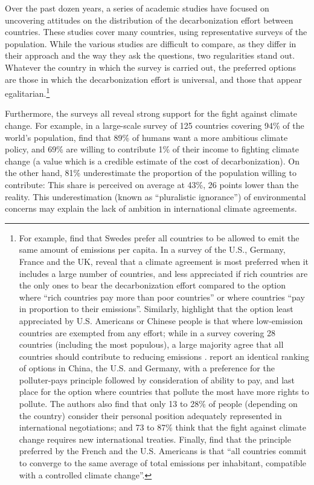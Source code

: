 \documentclass[a5paper,english,openany]{memoir}
\begin{document}
Over the past dozen years, a series of academic studies have focused on uncovering attitudes on the distribution of the decarbonization effort between countries. These studies cover many countries, using representative surveys of the population. While the various studies are difficult to compare, as they differ in their approach and the way they ask the questions, two regularities stand out. Whatever the country in which the survey is carried out, the preferred options are those in which the decarbonization effort is universal, and those that appear egalitarian.\footnote{For example, \citet{carlsson_is_2011} find that Swedes prefer all countries to be allowed to emit the same amount of emissions per capita. In a survey of the U.S., Germany, France and the UK, \citet{bechtel_mass_2013} reveal that a climate agreement is most preferred when it includes a large number of countries, %
and less appreciated if rich countries are the only ones to bear the decarbonization effort compared to the option where ``rich countries pay more than poor countries'' or where countries ``pay in proportion to their emissions''. Similarly, \citet{carlsson_fair_2013} highlight that the option least appreciated by U.S. Americans or Chinese people is that where low-emission countries are exempted from any effort; while in a survey covering 28 countries (including the most populous), a large majority agree that all countries should contribute to reducing emissions \citep{dabla-norris_public_2023}. 
\citet{schleich_citizens_2016} report an identical ranking of options in China, the U.S. and Germany, with a preference for the polluter-pays principle followed by consideration of ability to pay, and last place for the option where countries that pollute the most have more rights to pollute. The authors also find that only 13 to 28\% of people (depending on the country) consider their personal position adequately represented in international negotiations; and 73 to 87\% think that the fight against climate change requires new international treaties. Finally, \citet{meilland_international_2024} find that the principle preferred by the French and the U.S. Americans is that ``all countries commit to converge to the same average of total emissions per inhabitant, compatible with a controlled climate change''.} %

Furthermore, the surveys all reveal strong support for the fight against climate change. For example, in a large-scale survey of 125 countries covering 94\% of the world's population, \citet{andre_globally_2024} find that 89\% of humans want a more ambitious climate policy, and 69\% are willing to contribute 1\% of their income to fighting climate change (a value which is a credible estimate of the cost of decarbonization). 
On the other hand, 81\% underestimate the proportion of the population willing to contribute: %
This share is perceived on average at 43\%, 26 points lower than the reality. This underestimation (known as ``pluralistic ignorance'') of environmental concerns may explain the lack of ambition in international climate agreements. %
\end{document}
